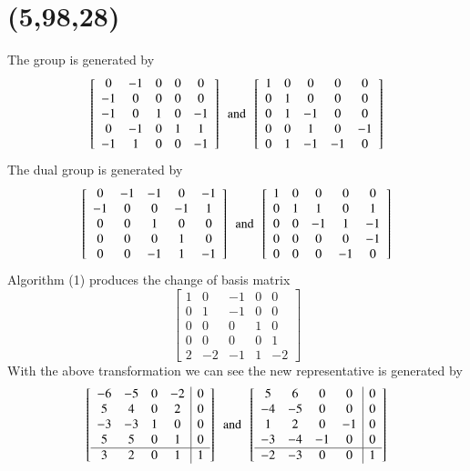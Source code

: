   \section{(5,98,28)}
The group is generated by 
$$
 \left[ \begin {array}{ccccc} 0&-1&0&0&0\\-1&0&0&0&0
\\-1&0&1&0&-1\\0&-1&0&1&1
\\-1&1&0&0&-1\end {array} \right] 
\,\,\, \text{and} \,\,\,
 \left[ \begin {array}{ccccc} 1&0&0&0&0\\0&1&0&0&0
\\0&1&-1&0&0\\0&0&1&0&-1
\\0&1&-1&-1&0\end {array} \right] 
$$
The dual group is generated by 
$$
 \left[ \begin {array}{ccccc} 0&-1&-1&0&-1\\-1&0&0&
-1&1\\0&0&1&0&0\\0&0&0&1&0
\\0&0&-1&1&-1\end {array} \right] 
\,\,\, \text{and} \,\,\,
 \left[ \begin {array}{ccccc} 1&0&0&0&0\\0&1&1&0&1
\\0&0&-1&1&-1\\0&0&0&0&-1
\\0&0&0&-1&0\end {array} \right] 
$$
Algorithm (1) produces the change of basis matrix 
$$
 \left[ \begin {array}{ccccc} 1&0&-1&0&0\\ 0&1&-1&0&0
\\ 0&0&0&1&0\\ 0&0&0&0&1
\\ 2&-2&-1&1&-2\end {array} \right] 
$$
With the above transformation we can see the new representative is generated by 
$$
  \left[ \begin {array}{cccc|c} -6&-5&0&-2&0\\5&4&0&2
&0\\-3&-3&1&0&0\\5&5&0&1&0
\\ \hline 3&2&0&1&1\end {array} \right] 
\,\,\, \text{and} \,\,\,
 \left[ \begin {array}{cccc|c} 5&6&0&0&0\\-4&-5&0&0&0
\\1&2&0&-1&0\\-3&-4&-1&0&0
\\ \hline -2&-3&0&0&1\end {array} \right] 
$$

